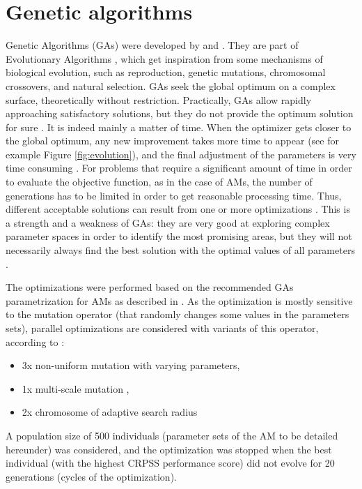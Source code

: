 \documentclass[5p]{elsarticle}
\begin{document}
\section{Genetic algorithms}
\label{sec:gas}

Genetic Algorithms (GAs) were developed by \citet{Holland1992b} and \citet{Goldberg1989}. They are part of Evolutionary Algorithms \citep{Back1993b, Schwefel1993}, which get inspiration from some mechanisms of biological evolution, such as reproduction, genetic mutations, chromosomal crossovers, and natural selection. GAs seek the global optimum on a complex surface, theoretically without restriction. Practically, GAs allow rapidly approaching satisfactory solutions, but they do not provide the optimum solution for sure \citep{Zitzler2004a}. It is indeed mainly a matter of time. When the optimizer gets closer to the global optimum, any new improvement takes more time to appear (see for example Figure \ref{fig:evolution}), and the final adjustment of the parameters is very time consuming \citep{Back1993a}. For problems that require a significant amount of time in order to evaluate the objective function, as in the case of AMs, the number of generations has to be limited in order to get reasonable processing time. Thus, different acceptable solutions can result from one or more optimizations \citep{Holland1992b}. This is a strength and a weakness of GAs: they are very good at exploring complex parameter spaces in order to identify the most promising areas, but they will not necessarily always find the best solution with the optimal values of all parameters \citep{Holland1992b}.

The optimizations were performed based on the recommended GAs parametrization for AMs as described in \citet{Horton2016a}. As the optimization is mostly sensitive to the mutation operator (that randomly changes some values in the parameters sets), parallel optimizations are considered with variants of this operator, according to \citet{Horton2016a}:

\begin{itemize}
	\item 3x non-uniform mutation \citep{Michalewicz1996} with varying parameters,
	\item 1x multi-scale mutation \citep{Horton2016a},
	\item 2x chromosome of adaptive search radius \citep{Horton2016a}
\end{itemize}

A population size of 500 individuals (parameter sets of the AM to be detailed hereunder) was considered, and the optimization was stopped when the best individual (with the highest CRPSS performance score) did not evolve for 20 generations (cycles of the optimization).
\end{document}
